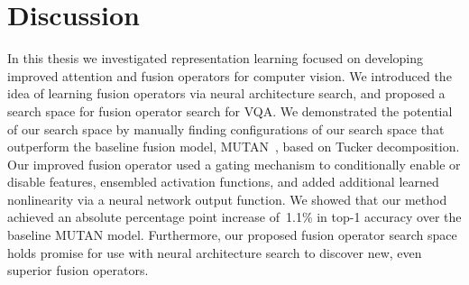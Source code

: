 \chapter{Discussion}

In this thesis we investigated representation learning focused on developing
improved attention and fusion operators for computer vision.
We introduced the idea of learning fusion operators via neural architecture
search, and proposed a search space for fusion operator search for VQA\@.
We demonstrated the potential of our search space by manually finding
configurations of our search space that outperform the baseline fusion model,
MUTAN~\citep{ben2017mutan}, based on Tucker decomposition.
Our improved fusion operator used a gating mechanism to conditionally enable or
disable features, ensembled activation functions, and added additional learned
nonlinearity via a neural network output function.
We showed that our method achieved an absolute percentage point increase
of~\num{1.1}\% in top-1 accuracy over the baseline MUTAN model.
Furthermore, our proposed fusion operator search space holds promise for use
with neural architecture search to discover new, even superior fusion
operators.

